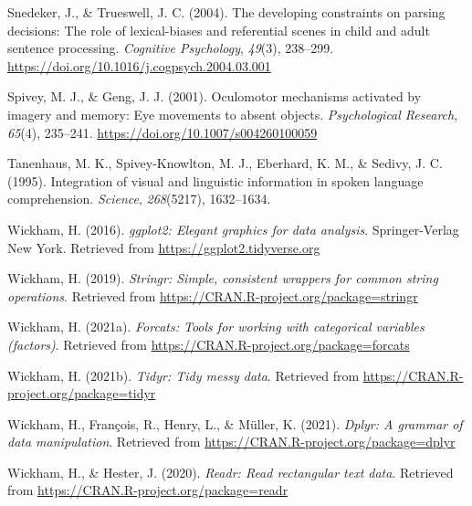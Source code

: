 \documentclass[
  man,floatsintext]{apa6}
\newlength{\cslhangindent}
\newlength{\cslentryspacingunit} %
\newenvironment{CSLReferences}[2] %
 {%
  \setlength{\parindent}{0pt}
  \ifodd #1
  \let\oldpar\par
  \def\par{\hangindent=\cslhangindent\oldpar}
  \fi
  \setlength{\parskip}{#2\cslentryspacingunit}
 }%
 {}
\begin{document}
\begin{CSLReferences}{1}{0}
\leavevmode{}%
Snedeker, J., \& Trueswell, J. C. (2004). The developing constraints on parsing decisions: {The} role of lexical-biases and referential scenes in child and adult sentence processing. \emph{Cognitive Psychology}, \emph{49}(3), 238--299. \url{https://doi.org/10.1016/j.cogpsych.2004.03.001}

\leavevmode{}%
Spivey, M. J., \& Geng, J. J. (2001). Oculomotor mechanisms activated by imagery and memory: Eye movements to absent objects. \emph{Psychological Research}, \emph{65}(4), 235--241. \url{https://doi.org/10.1007/s004260100059}

\leavevmode{}%
Tanenhaus, M. K., Spivey-Knowlton, M. J., Eberhard, K. M., \& Sedivy, J. C. (1995). Integration of visual and linguistic information in spoken language comprehension. \emph{Science}, \emph{268}(5217), 1632--1634.

\leavevmode{}%
Wickham, H. (2016). \emph{ggplot2: Elegant graphics for data analysis}. Springer-Verlag New York. Retrieved from \url{https://ggplot2.tidyverse.org}

\leavevmode{}%
Wickham, H. (2019). \emph{Stringr: Simple, consistent wrappers for common string operations}. Retrieved from \url{https://CRAN.R-project.org/package=stringr}

\leavevmode{}%
Wickham, H. (2021a). \emph{Forcats: Tools for working with categorical variables (factors)}. Retrieved from \url{https://CRAN.R-project.org/package=forcats}

\leavevmode{}%
Wickham, H. (2021b). \emph{Tidyr: Tidy messy data}. Retrieved from \url{https://CRAN.R-project.org/package=tidyr}

\leavevmode{}%
Wickham, H., François, R., Henry, L., \& Müller, K. (2021). \emph{Dplyr: A grammar of data manipulation}. Retrieved from \url{https://CRAN.R-project.org/package=dplyr}

\leavevmode{}%
Wickham, H., \& Hester, J. (2020). \emph{Readr: Read rectangular text data}. Retrieved from \url{https://CRAN.R-project.org/package=readr}

\end{CSLReferences}

\endgroup
\end{document}

